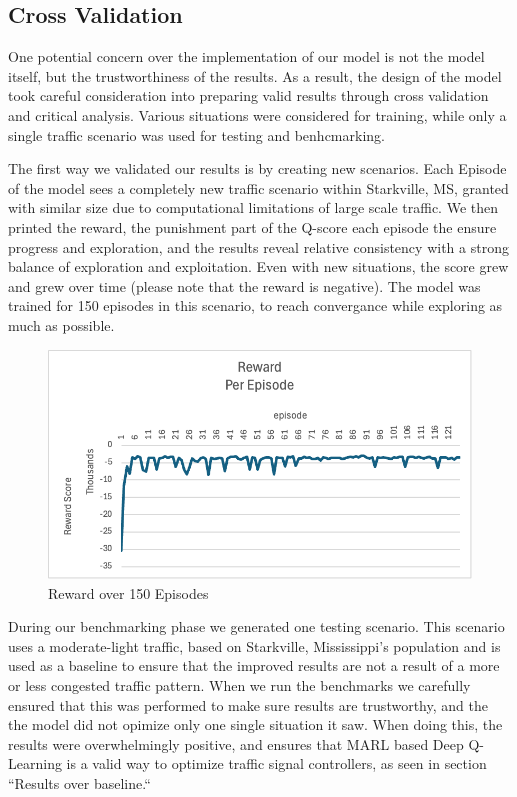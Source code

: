 \documentclass[conference]{IEEEtran}
\begin{document}
\subsection{Cross Validation}

One potential concern over the implementation of our model is not the model itself, but the trustworthiness of the results. As a result, the design of the model took careful consideration into preparing valid results through cross validation and critical analysis. Various situations were considered for training, while only a single traffic scenario was used for testing and benhcmarking. 

The first way we validated our results is by creating new scenarios. Each Episode of the model sees a completely new traffic scenario within Starkville, MS, granted with similar size due to computational limitations of large scale traffic. We then printed the reward, the punishment part of the Q-score each episode the ensure progress and exploration, and the results reveal relative consistency with a strong balance of exploration and exploitation. Even with new situations, the score grew and grew over time (please note that the reward is negative). The model was trained for 150 episodes in this scenario, to reach convergance while exploring as much as possible. 

\begin{figure}
    \centering
    \includegraphics[width=0.9\linewidth]{Reward.png}
    \caption{Reward over 150 Episodes}
\end{figure}

During our benchmarking phase we generated one testing scenario. This scenario uses a moderate-light traffic, based on Starkville, Mississippi's population and is used as a baseline to ensure that the improved results are not a result of a more or less congested traffic pattern. When we run the benchmarks we carefully ensured that this was performed to make sure results are trustworthy, and the the model did not opimize only one single situation it saw. When doing this, the results were overwhelmingly positive, and ensures that MARL based Deep Q-Learning is a valid way to optimize traffic signal controllers, as seen in section ``Results over baseline.``
\end{document}
